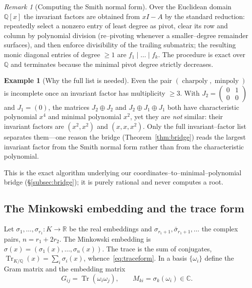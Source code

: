 \documentclass[11pt]{article}
\theoremstyle{plain}
\theoremstyle{definition}
\newtheorem{example}[theorem]{Example}
\theoremstyle{remark}
\newtheorem{remark}[theorem]{Remark}
\newcommand{\Q}{\mathbb{Q}}
\newcommand{\R}{\mathbb{R}}
\newcommand{\C}{\mathbb{C}}
\newcommand{\K}{K}
\newcommand{\Tr}{\operatorname{Tr}}
\newcommand{\charpoly}{\operatorname{charpoly}}
\newcommand{\minpoly}{\operatorname{minpoly}}
\newcommand{\GG}{G}
\begin{document}
\begin{remark}[Computing the Smith normal form]\label{rem:snf}
Over the Euclidean domain $\Q[x]$ the invariant factors are obtained from $xI-A$ by the standard reduction:
repeatedly select a nonzero entry of least degree as pivot, clear its row and column by polynomial division
(re--pivoting whenever a smaller--degree remainder surfaces), and then enforce divisibility of the trailing
submatrix; the resulting monic diagonal entries of degree $\ge1$ are $f_1\mid\dots\mid f_k$. The procedure is
exact over $\Q$ and terminates because the minimal pivot degree strictly decreases.
\end{remark}

\begin{example}[Why the full list is needed]\label{ex:jordan}
Even the pair $(\charpoly,\minpoly)$ is incomplete once an invariant factor has multiplicity $\ge3$. With
$J_2=\left(\begin{smallmatrix}0&1\\0&0\end{smallmatrix}\right)$ and $J_1=(0)$, the matrices $J_2\oplus J_2$ and
$J_2\oplus J_1\oplus J_1$ both have characteristic polynomial $x^4$ and minimal polynomial $x^2$, yet they are
\emph{not} similar: their invariant factors are $(x^2,x^2)$ and $(x,x,x^2)$. Only the full invariant--factor
list separates them---one reason the bridge (Theorem~\ref{thm:bridge}) reads the largest invariant factor from
the Smith normal form rather than from the characteristic polynomial.
\end{example}

This is the exact algorithm underlying our coordinates--to--minimal--polynomial bridge
(\S\ref{subsec:bridge}); it is purely rational and never computes a root.

\subsection{The Minkowski embedding and the trace form}
Let $\sigma_1,\dots,\sigma_{r_1}\colon\K\to\R$ be the real embeddings and
$\sigma_{r_1+1},\bar\sigma_{r_1+1},\dots$ the complex pairs, $n=r_1+2r_2$. The Minkowski embedding is
$\sigma(x)=(\sigma_1(x),\dots,\sigma_n(x))$. The trace is the sum of conjugates,
$\Tr_{\K/\Q}(x)=\sum_i\sigma_i(x)$, whence~\eqref{eq:traceform}. In a basis $\{\omega_i\}$ define the Gram
matrix and the embedding matrix
\begin{equation}\label{eq:GandM}
  \GG_{ij}=\Tr(\omega_i\omega_j), \qquad M_{ki}=\sigma_k(\omega_i)\in\C.
\end{equation}
\end{document}

